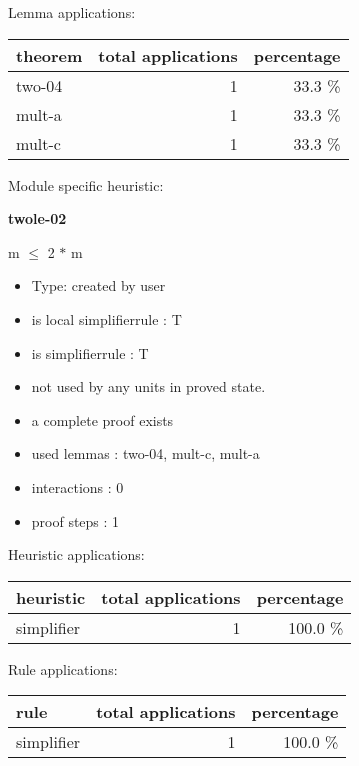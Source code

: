 \documentclass[a4paper]{article}
\begin{document}
Lemma applications:

\begin{supertabular}{l|r|r}
theorem	        & total applications & percentage \\ \hline
two-04 & 1 & 33.3 \% \\
mult-a & 1 & 33.3 \% \\
mult-c & 1 & 33.3 \% \\

\end{supertabular}

Module specific heuristic:

\pagebreak

{\LARGE\bf twole-02}\label{lemma-twole-02}

\medskip

 \Fol m $\le$ 2 $*$ m

\begin{itemize}

\item Type: created by user

\item is local simplifierrule : T
\item is simplifierrule : T
\item not used by any units in proved state.
\item       a complete proof exists
\item       used lemmas  : two-04, mult-c, mult-a
\item       interactions : 0
\item       proof steps  : 1
\end{itemize}

\medskip


Heuristic applications:

\begin{supertabular}{l|r|r}
heuristic	& total applications & percentage \\ \hline
simplifier & 1 & 100.0 \% \\

\end{supertabular}

Rule applications:

\begin{supertabular}{l|r|r}
rule	        & total applications & percentage \\ \hline
simplifier & 1 & 100.0 \% \\

\end{supertabular}
\end{document}
